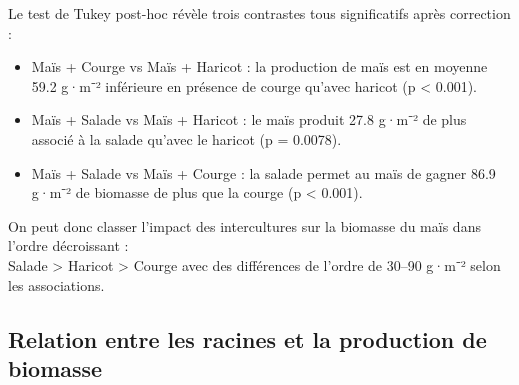 \documentclass[
]{article}
\begin{document}
Le test de Tukey post-hoc révèle trois contrastes tous significatifs
après correction :

\begin{itemize}
\item
  Maïs + Courge vs Maïs + Haricot : la production de maïs est en moyenne
  59.2 g·m⁻² inférieure en présence de courge qu'avec haricot (p
  \textless{} 0.001).
\item
  Maïs + Salade vs Maïs + Haricot : le maïs produit 27.8 g·m⁻² de plus
  associé à la salade qu'avec le haricot (p = 0.0078).
\item
  Maïs + Salade vs Maïs + Courge : la salade permet au maïs de gagner
  86.9 g·m⁻² de biomasse de plus que la courge (p \textless{} 0.001).
\end{itemize}

On peut donc classer l'impact des intercultures sur la biomasse du maïs
dans l'ordre décroissant :\\
Salade \textgreater{} Haricot \textgreater{} Courge avec des différences
de l'ordre de 30--90 g·m⁻² selon les associations.

\newpage

\subsection{Relation entre les racines et la production de
biomasse}\label{relation-entre-les-racines-et-la-production-de-biomasse}
\end{document}
